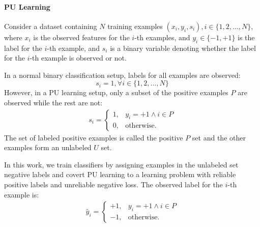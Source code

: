 
\paragraph{PU Learning}
Consider a dataset containing $N$ training examples $(x_i,y_i,s_i), i \in \{1, 2, \dots, N\}$, where $x_i$ is the observed features for the $i$-th examples, and $y_i \in \{-1,+1\}$ is the label for the $i$-th example, and $s_i$ is a binary variable denoting whether the label for the $i$-th example is observed or not.



In a normal binary classification setup, labels for all examples are observed:
\begin{equation}
  s_i=1, \forall i\in\{1,2,\dots,N\}
\end{equation}
However, in a PU learning setup, only a subset of the positive examples $P$ are observed while the rest are not:
\begin{eqnarray}
s_i =
  \begin{cases}
    1, & y_i = +1 \land i\in P\\
    0, & \text{otherwise}.
  \end{cases}
\end{eqnarray}
The set of labeled positive examples is called the positive $P$ set and the other examples form an unlabeled $U$ set.

In this work, we train classifiers by assigning examples in the unlabeled set negative labels and covert PU learning to a learning problem with reliable positive labels and unreliable negative loss.
The observed label for the $i$-th example is:
\begin{eqnarray}
\tilde{y_i} =
  \begin{cases}
    +1, & y_i = +1 \land i\in P\\
    -1, & \text{otherwise}.
  \end{cases}
\end{eqnarray}

%
